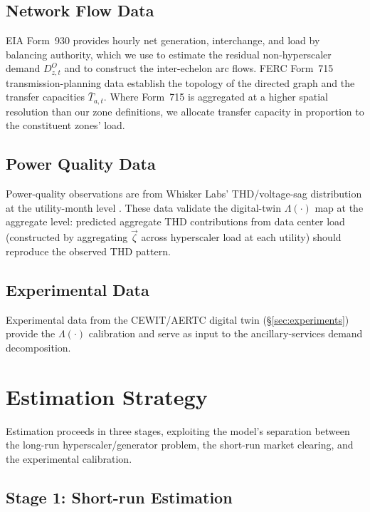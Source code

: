 \documentclass[12pt,letterpaper]{article}
\begin{document}
\subsection{Network Flow Data}

EIA Form~930 provides hourly net generation, interchange, and load by
balancing authority, which we use to estimate the residual non-hyperscaler
demand $D^O_{z,t}$ and to construct the inter-echelon arc flows. FERC
Form~715 transmission-planning data establish the topology of the directed
graph and the transfer capacities $\bar T_{a,t}$. Where Form~715 is
aggregated at a higher spatial resolution than our zone definitions, we
allocate transfer capacity in proportion to the constituent zones' load.

\subsection{Power Quality Data}

Power-quality observations are from Whisker Labs' THD/voltage-sag
distribution at the utility-month level \citep{WhiskerLabs_THD_2024,
LaughnerEtAl_2024_THDonUSGrid}. These data validate the digital-twin
$\Lambda(\cdot)$ map at the aggregate level: predicted aggregate THD
contributions from data center load (constructed by aggregating
$\vec\zeta$ across hyperscaler load at each utility) should reproduce
the observed THD pattern.

\subsection{Experimental Data}

Experimental data from the CEWIT/AERTC digital twin (\S\ref{sec:experiments})
provide the $\Lambda(\cdot)$ calibration and serve as input to the
ancillary-services demand decomposition.

\section{Estimation Strategy}
\label{sec:estimation}

Estimation proceeds in three stages, exploiting the model's separation
between the long-run hyperscaler/generator problem, the short-run market
clearing, and the experimental calibration.

\subsection{Stage 1: Short-run Estimation}
\label{sec:est_short}
\end{document}

